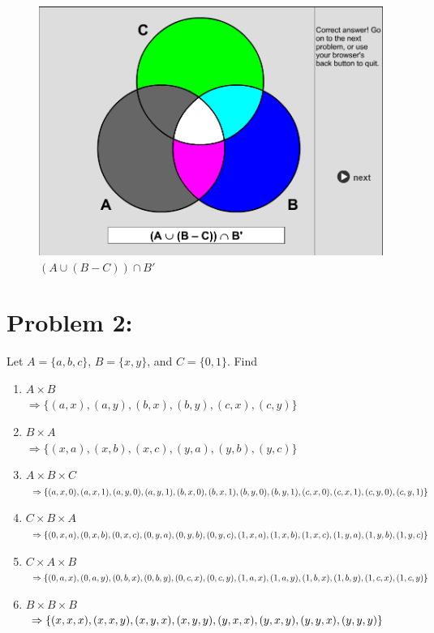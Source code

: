 \documentclass[12pt,en,a4paper]{article}
\begin{document}
	\begin{figure}[ht]
		\begin{minipage}{0.5\textwidth}
			\includegraphics[width=1.0\textwidth]{SOL_set_1_7.png}
			\caption*{$(A \cup (B-C))\cap B \prime $}
			\label{fig:prob_1_7}
		\end{minipage}
	\end{figure}
\newpage
{}
	\section*{Problem 2:}
	Let $A = \{a,b,c\}$, $B=\{x,y\}$, and $C=\{0,1\}$. Find
	\begin{enumerate}
		\item $A \times B$\\
		$\Rightarrow \{(a,x),(a,y),(b,x),(b,y),(c,x),(c,y)\}$
		\item $B \times A$\\
		$\Rightarrow \{(x,a),(x,b),(x,c),(y,a),(y,b),(y,c)\}$
		\item $A \times B \times C$\\
		$\Rightarrow \{(a,x,0),(a,x,1),(a,y,0),(a,y,1),\\
		(b,x,0),(b,x,1),(b,y,0),(b,y,1),\\
		(c,x,0),(c,x,1),(c,y,0),(c,y,1)\}$
		\item $C \times B \times A$\\
		$\Rightarrow \{(0,x,a),(0,x,b),(0,x,c),\\
		(0,y,a),(0,y,b),(0,y,c),\\
		(1,x,a),(1,x,b),(1,x,c),\\
		(1,y,a),(1,y,b),(1,y,c)\}$
		\item $C \times A \times B$\\
		$\Rightarrow \{(0,a,x),(0,a,y),(0,b,x),(0,b,y),(0,c,x),(0,c,y),\\
		(1,a,x),(1,a,y),(1,b,x),(1,b,y),(1,c,x),(1,c,y)\}$
		\item $B \times B \times B$\\
		$\Rightarrow \{(x,x,x),(x,x,y),(x,y,x),(x,y,y),\\
		(y,x,x),(y,x,y),(y,y,x),(y,y,y)\}$
	\end{enumerate}
\newpage
{}
\end{document}
